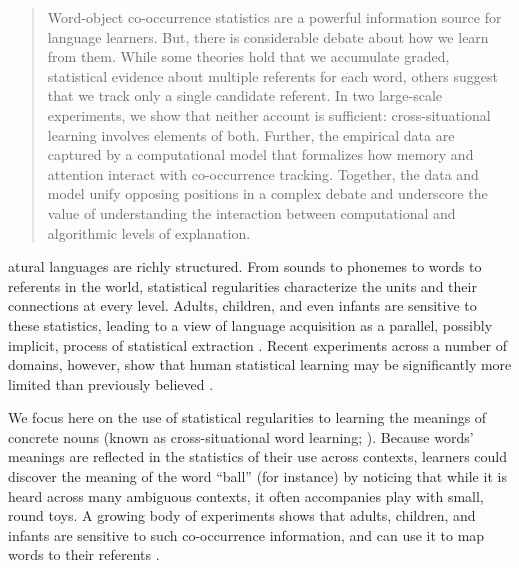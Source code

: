 \documentclass{pnastwo}
\begin{document}
\begin{article}
\begin{abstract}

Word-object co-occurrence statistics are a powerful information source for language learners. But, there is considerable debate about how we learn from them. While some theories hold that we accumulate graded, statistical evidence about multiple referents for each word, others suggest that we track only a single candidate referent. In two large-scale experiments, we show that neither account is sufficient: cross-situational learning involves elements of both. Further, the empirical data are captured by a computational model that formalizes how memory and attention interact with co-occurrence tracking. Together, the data and model unify opposing positions in a complex debate and underscore the value of understanding the interaction between computational and algorithmic levels of explanation.
\end{abstract}

atural languages are richly structured. From sounds to phonemes to words to referents in the world, statistical regularities characterize the units and their connections at every level. Adults, children, and even infants are sensitive to these statistics, leading to a view of language acquisition as a parallel, possibly implicit, process of statistical extraction \citep{Saffran1996a, Gomez2000}. Recent experiments across a number of domains, however, show that human statistical learning may be significantly more limited than previously believed \citep{Johnson2010c, Yurovsky2012c, Trueswell2013}.

We focus here on the use of statistical regularities to learning the meanings of concrete nouns (known as cross-situational word learning; \citealp{Pinker1989, Siskind1996, Yu2007}). Because words' meanings are reflected in the statistics of their use across contexts, learners could discover the meaning of the word ``ball'' (for instance) by noticing that while it is heard across many ambiguous contexts, it often accompanies play with small, round toys. A growing body of experiments shows that adults, children, and infants are sensitive to such co-occurrence information, and can use it to map words to their referents \citep{Yu2007, Smith2008, Scott2012, Vlach2013}.


\end{article}
\end{document}

